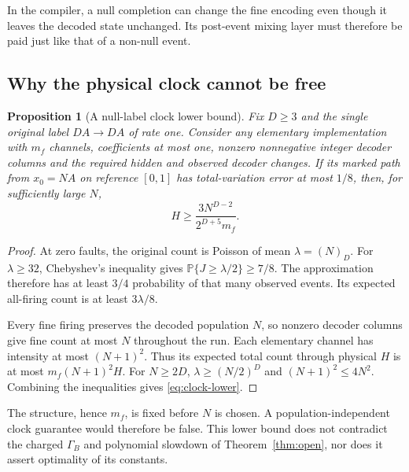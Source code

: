 \documentclass[11pt,reqno]{amsart}
\newtheorem{proposition}[theorem]{Proposition}
\theoremstyle{definition}
\theoremstyle{remark}
\newcommand{\Prob}{\mathbb P}
\begin{document}
In the compiler, a null completion can change the fine encoding even though
it leaves the decoded state unchanged. Its post-event mixing layer must
therefore be paid just like that of a non-null event.

\subsection{Why the physical clock cannot be free}
\begin{proposition}[A null-label clock lower bound]\label{prop:clock-lower}
Fix $D\ge3$ and the single original label $DA\to DA$ of rate one.
Consider any elementary implementation with $m_f$ channels, coefficients at
most one, nonzero nonnegative integer decoder columns and the required hidden
and observed decoder changes. If its marked path from $x_0=NA$ on reference
$[0,1]$ has total-variation error at most $1/8$, then, for sufficiently large
$N$,
\begin{equation}\label{eq:clock-lower}
 H\ge\frac{3N^{D-2}}{2^{D+5}m_f}.
\end{equation}
\end{proposition}
\begin{proof}
At zero faults, the original count is Poisson of mean
$\lambda=(N)_D$. For $\lambda\ge32$, Chebyshev's inequality gives
$\Prob\{J\ge\lambda/2\}\ge7/8$. The approximation therefore has at least
$3/4$ probability of that many observed events. Its expected all-firing count
is at least $3\lambda/8$.

Every fine firing preserves the decoded population $N$, so nonzero decoder
columns give fine count at most $N$ throughout the run. Each elementary
channel has intensity at most $(N+1)^2$. Thus its expected total count through
physical $H$ is at most $m_f(N+1)^2H$. For $N\ge2D$,
$\lambda\ge(N/2)^D$ and $(N+1)^2\le4N^2$. Combining the inequalities gives
\eqref{eq:clock-lower}.
\end{proof}
The structure, hence $m_f$, is fixed before $N$ is chosen. A
population-independent clock guarantee would therefore be false. This lower
bound does not contradict the charged $\Gamma_B$ and polynomial slowdown of
Theorem~\ref{thm:open}, nor does it assert optimality of its constants.
\end{document}

